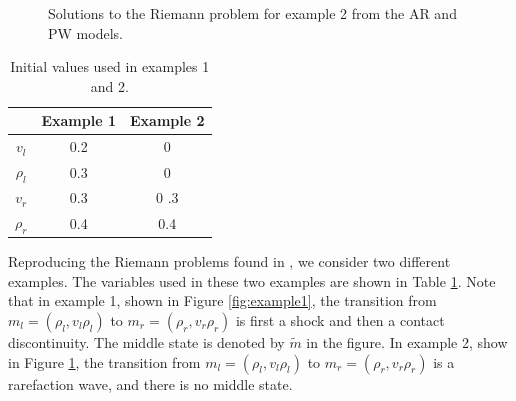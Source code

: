 \documentclass{article}
\begin{document}
\begin{figure}[h!]
 \centering
 \caption[Optional caption for list of figures]
 {Solutions to the Riemann problem for example 2 from the AR and PW models.}
  \label{fig:example2}
\end{figure}

\begin{table}[t]
\caption{Initial values used in examples 1 and 2.}
\begin{center}
\begin{tabular}{| c | c c |}
\hline
& Example 1 & Example 2\\
\hline
$v_l$ & 0.2 & 0 \\
$\rho_l$ & 0.3 & 0\\
$v_r$ & 0.3 & 0 .3\\
$\rho_r$ & 0.4 & 0.4\\
\hline
\end{tabular}
\end{center}
 \label{table:1}
\end{table}

Reproducing the Riemann problems found in \cite{AwRascle2000}, we consider two different examples. The variables used in these two examples are shown in Table \ref{table:1}. Note that in example 1, shown in Figure \ref{fig:example1}, the transition from $m_l = (\rho_l, v_l\rho_l)$ to $m_r = (\rho_r, v_r\rho_r)$ is first a shock and then a contact discontinuity. The middle state is denoted by $\tilde{m}$ in the figure. In example 2, show in Figure \ref{fig:example2}, the transition from $m_l = (\rho_l, v_l\rho_l)$ to $m_r = (\rho_r, v_r\rho_r)$ is a rarefaction wave, and there is no middle state.

{}

\end{document}
